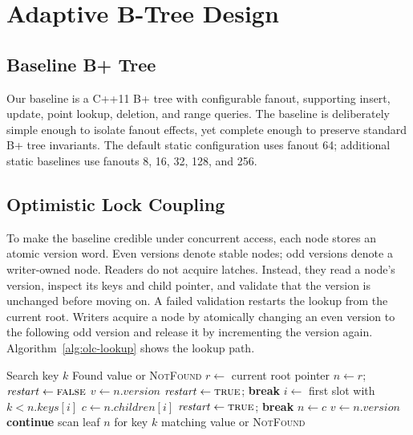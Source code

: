 \documentclass[sigconf,screen]{acmart}
\begin{document}
\section{Adaptive B-Tree Design}

\subsection{Baseline B+ Tree}

Our baseline is a C++11 B+ tree with configurable fanout, supporting insert,
update, point lookup, deletion, and range queries.  The baseline is deliberately
simple enough to isolate fanout effects, yet complete enough to preserve
standard B+ tree invariants.  The default static configuration uses fanout 64;
additional static baselines use fanouts 8, 16, 32, 128, and 256.

\subsection{Optimistic Lock Coupling}

To make the baseline credible under concurrent access, each node stores an
atomic version word.  Even versions denote stable nodes; odd versions denote a
writer-owned node.  Readers do not acquire latches.  Instead, they read a
node's version, inspect its keys and child pointer, and validate that the
version is unchanged before moving on.  A failed validation restarts the
lookup from the current root.  Writers acquire a node by atomically changing an
even version to the following odd version and release it by incrementing the
version again.  Algorithm~\ref{alg:olc-lookup} shows the lookup path.

\begin{algorithm}[t]
\caption{Optimistic lock-coupled point lookup}
\label{alg:olc-lookup}
\begin{algorithmic}[1]
\Require Search key $k$
\Ensure Found value or \textsc{NotFound}
\Repeat
  \State $r \gets$ current root pointer
  \State $n \gets r$; $\mathit{restart}\gets\textsc{false}$
    \State $v \gets n.\mathit{version}$
      \State $\mathit{restart}\gets\textsc{true}$; \textbf{break}
    \EndIf
    \State $i \gets$ first slot with $k < n.\mathit{keys}[i]$
    \State $c \gets n.\mathit{children}[i]$
      \State $\mathit{restart}\gets\textsc{true}$; \textbf{break}
    \EndIf
    \State $n \gets c$
  \EndWhile
    \State $v \gets n.\mathit{version}$
     \State \textbf{continue} \EndIf
    \State scan leaf $n$ for key $k$
      \State \Return matching value or \textsc{NotFound}
    \EndIf
  \EndIf
{}
\end{algorithmic}
\end{algorithm}
\end{document}

